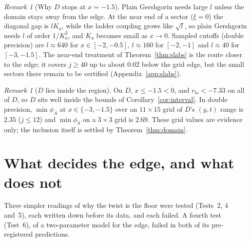 \documentclass[11pt]{article}
\theoremstyle{definition}
\theoremstyle{remark}
\newtheorem{remark}[theorem]{Remark}
\begin{document}
\begin{remark}[Why $D$ stops at $x=-1.5$]\label{rem:Dstop}
Plain Gershgorin needs large $l$ unless the domain stays away from the edge. At the near end of a sector ($\xi=0$) the
diagonal gap is $lK_a$, while the ladder coupling grows like $\sqrt l$, so plain Gershgorin needs $l$ of order
$1/K_a^2$, and $K_a$ becomes small as $x\to0$. Sampled cutoffs (double precision) are $l\approx640$ for
$x\in[-2,-0.5]$, $l\approx160$ for $[-2,-1]$ and $l\approx40$ for $[-3,-1.5]$. The near-end treatment of
Theorem~\ref{thm:slabs} is the route closer to the edge; it covers $j\ge40$ up to about $0.02$ below the grid edge, but
the small sectors there remain to be certified (Appendix~\ref{app:slabs}).
\end{remark}

\begin{remark}[$D$ lies inside the region]\label{rem:Dinside}
On $D$, $x\le-1.5<0$, and $r_{\mathrm{lo}}<-7.33$ on all of $D$, so $D$ sits well inside the bounds of
Corollary~\ref{cor:interval}. In double precision, $\min\phi_A$ at $x\in\{-3,-1.5\}$ over an $11\times15$ grid of $D$'s
$(y,t)$ range is $2.35$ ($j\le12$) and $\min\phi_S$ on a $3\times3$ grid is $2.69$. These grid values are evidence only;
the inclusion itself is settled by Theorem~\ref{thm:domain}.
\end{remark}

\section{What decides the edge, and what does not}\label{sec:decide}

Three simpler readings of why the twist is the floor were tested (Tests~2, 4 and~5), each written down before its
data, and each failed. A fourth test (Test~6), of a two-parameter model for the edge, failed in both of its
pre-registered predictions.
\end{document}
